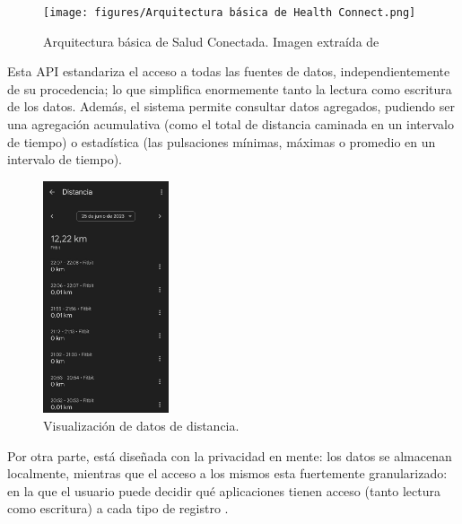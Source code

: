             \begin{figure}[h]
                \centering
                \texttt{[image: figures/Arquitectura básica de Health Connect.png]}
                \caption[Arquitectura básica de Salud Conectada.]
                {Arquitectura básica de  Salud Conectada. Imagen extraída de \cite{wilk_introducing_2022}}
                \label{figure:health_connect:arquitectura}
            \end{figure}

            Esta API estandariza el acceso a todas las fuentes de datos, independientemente de su procedencia; lo que
            simplifica enormemente tanto la lectura como escritura de los datos. Además, el sistema permite consultar
            datos agregados, pudiendo ser una agregación acumulativa (como el total de distancia caminada en un 
            intervalo de tiempo) o estadística (las pulsaciones mínimas, máximas o promedio en un intervalo de tiempo).

            \begin{figure}[h]
                \centering
                \includegraphics[width=0.33\textwidth]{figures/Health Connect lectura datos.jpg}
                \caption[Visualización de datos de distancia.]
                {Visualización de datos de distancia.}
                \label{figure:health_connect:visualizacion_datos}
            \end{figure}
            
            Por otra parte, está diseñada con la privacidad en mente: los datos se almacenan localmente, mientras que el 
            acceso a los mismos esta fuertemente granularizado: en la que el usuario puede
            decidir qué aplicaciones tienen acceso (tanto lectura como escritura) a cada tipo de registro 
            \cite{saez_google_2022}.  
            
